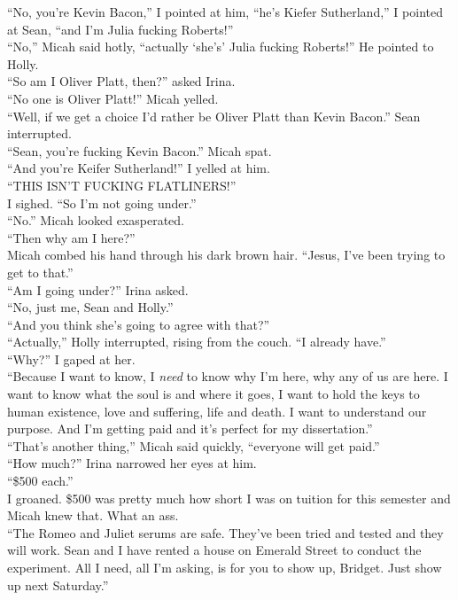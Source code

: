 \documentclass[a5paper]{scrartcl}
\begin{document}
\enquote{No, you're Kevin Bacon,} I pointed at him, \enquote{he's Kiefer Sutherland,} I pointed at Sean, \enquote{and I'm Julia fucking Roberts!}\\
\enquote{No,} Micah said hotly, \enquote{actually \enquote{she's} Julia fucking Roberts!} He pointed to Holly.\\
\enquote{So am I Oliver Platt, then?} asked Irina.\\
\enquote{No one is Oliver Platt!} Micah yelled.\\
\enquote{Well, if we get a choice I'd rather be Oliver Platt than Kevin Bacon.} Sean interrupted.\\
\enquote{Sean, you're fucking Kevin Bacon.} Micah spat.\\
\enquote{And you're Keifer Sutherland!} I yelled at him.\\
\enquote{THIS ISN'T FUCKING FLATLINERS!}\\
I sighed. \enquote{So I'm not going under.}\\
\enquote{No.} Micah looked exasperated.\\
\enquote{Then why am I here?}\\
Micah combed his hand through his dark brown hair. \enquote{Jesus, I've been trying to get to that.}\\
\enquote{Am I going under?} Irina asked.\\
\enquote{No, just me, Sean and Holly.}\\
\enquote{And you think she's going to agree with that?}\\
\enquote{Actually,} Holly interrupted, rising from the couch. \enquote{I already have.}\\
\enquote{Why?} I gaped at her.\\
\enquote{Because I want to know, I \textit{need} to know why I'm here, why any of us are here. I want to know what the soul is and where it goes, I want to hold the keys to human existence, love and suffering, life and death. I want to understand our purpose. And I'm getting paid and it's perfect for my dissertation.}\\
\enquote{That's another thing,} Micah said quickly, \enquote{everyone will get paid.}\\
\enquote{How much?} Irina narrowed her eyes at him.\\
\enquote{\$500 each.}\\
I groaned. \$500 was pretty much how short I was on tuition for this semester and Micah knew that. What an ass.\\
\enquote{The Romeo and Juliet serums are safe. They've been tried and tested and they will work. Sean and I have rented a house on Emerald Street to conduct the experiment. All I need, all I'm asking, is for you to show up, Bridget. Just show up next Saturday.}\\
\end{document}
